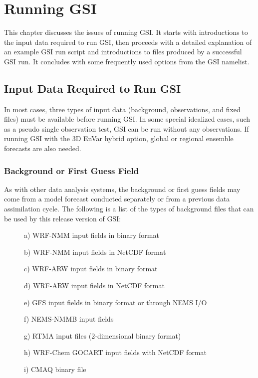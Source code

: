 \chapter{Running GSI}\label{gsi_run}
\setlength{\parskip}{12pt}

This chapter discusses the issues of running GSI. It starts with introductions to the input data required to run GSI, then proceeds with a detailed explanation of an example GSI run script and introductions to files produced by a successful GSI run. It concludes with some frequently used options from the GSI namelist.

\section{Input Data Required to Run GSI}
\label{sec3.1}

In most cases, three types of input data (background, observations, and fixed files) must be available before running GSI. In some special idealized cases, such as a pseudo single observation test, GSI can be run without any observations. If running GSI with the 3D EnVar hybrid option, global or regional ensemble forecasts are also needed.

\subsection{Background or First Guess Field}

As with other data analysis systems, the background or first guess fields may come from a model forecast conducted separately or from a previous data assimilation cycle. The following is a list of the types of background files that can be used by this release version of GSI:

\begin{small}
\begin{description}
\item[ ] a) WRF-NMM input fields in binary format
\item[ ] b) WRF-NMM input fields in NetCDF format
\item[ ] c) WRF-ARW input fields in binary format
\item[ ] d) WRF-ARW input fields in NetCDF format
\item[ ] e) GFS input fields in binary format or through NEMS I/O
\item[ ] f) NEMS-NMMB input fields
\item[ ] g) RTMA input files (2-dimensional binary format)
\item[ ] h) WRF-Chem GOCART input fields with NetCDF format
\item[ ] i) CMAQ binary file 
\end{description}
\end{small}

